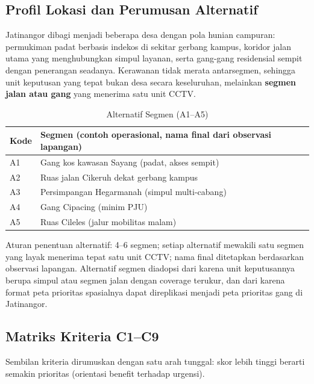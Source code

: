 \documentclass[conference]{IEEEtran}
\begin{document}
\subsection{Profil Lokasi dan Perumusan Alternatif}

Jatinangor dibagi menjadi beberapa desa dengan pola hunian campuran: permukiman padat berbasis indekos di sekitar gerbang kampus, koridor jalan utama yang menghubungkan simpul layanan, serta gang-gang residensial sempit dengan penerangan seadanya. Kerawanan tidak merata antarsegmen, sehingga unit keputusan yang tepat bukan desa secara keseluruhan, melainkan \textbf{segmen jalan atau gang} yang menerima satu unit CCTV.

\begin{table}[htbp]
\caption{Alternatif Segmen (A1--A5)}
\label{tab:alternatif}
\centering
\begin{tabular}{p{0.9cm}p{6.7cm}}
\toprule
\textbf{Kode} & \textbf{Segmen (contoh operasional, nama final dari observasi lapangan)} \\
\midrule
A1 & Gang kos kawasan Sayang (padat, akses sempit) \\
A2 & Ruas jalan Cikeruh dekat gerbang kampus \\
A3 & Persimpangan Hegarmanah (simpul multi-cabang) \\
A4 & Gang Cipacing (minim PJU) \\
A5 & Ruas Cileles (jalur mobilitas malam) \\
\bottomrule
\end{tabular}
\end{table}

Aturan penentuan alternatif: 4--6 segmen; setiap alternatif mewakili satu segmen yang layak menerima tepat satu unit CCTV; nama final ditetapkan berdasarkan observasi lapangan. Alternatif segmen diadopsi dari \cite{wang2025} karena unit keputusannya berupa simpul atau segmen jalan dengan coverage terukur, dan dari \cite{feizizadeh2025} karena format peta prioritas spasialnya dapat direplikasi menjadi peta prioritas gang di Jatinangor.

\subsection{Matriks Kriteria C1--C9}

Sembilan kriteria dirumuskan dengan satu arah tunggal: skor lebih tinggi berarti semakin prioritas (orientasi benefit terhadap urgensi).
\end{document}
